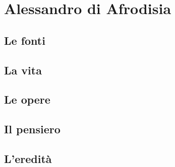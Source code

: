 \chapter{Alessandro di Afrodisia}

\section{Le fonti}

\section{La vita}

\section{Le opere}

\section{Il pensiero}

\section{L'eredità}
